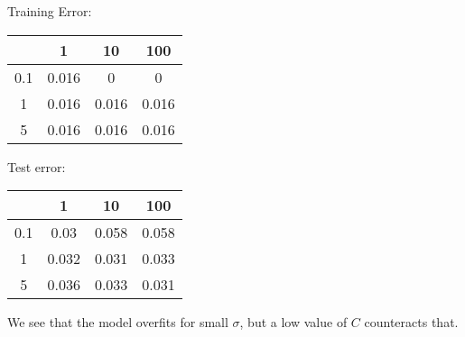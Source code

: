 Training Error:
\begin{tabular}{|c|c|c|c|}
\hline
&1&10&100\\
\hline
0.1&0.016&0&0\\
\hline
1&0.016&0.016&0.016\\
\hline
5&0.016&0.016&0.016\\
\hline
\end{tabular}
Test error:
\begin{tabular}{|c|c|c|c|}
\hline
&1&10&100\\
\hline
0.1&0.03&0.058&0.058\\
\hline
1&0.032&0.031&0.033\\
\hline
5&0.036&0.033&0.031\\
\hline
\end{tabular}

We see that the model overfits for small $\sigma$, but a low value of $C$ counteracts that.